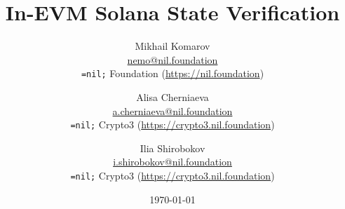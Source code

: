 \setlength{\droptitle}{-4\baselineskip} %

\pretitle{\begin{center}\Huge\bfseries} %
\title{In-EVM Solana State Verification} %
\posttitle{\end{center}} %
\author{ %
    \protect\begin{tabular}{c} \normalsize Mikhail Komarov \\
	    \normalsize \href{mailto:nemo@nil.foundation}{nemo@nil.foundation} \\
	    \normalsize \texttt{=nil;} Foundation (\url{https://nil.foundation})\\ 
	\protect\end{tabular}
    \and
	\protect\begin{tabular}{c} \normalsize Alisa Cherniaeva \\
	    \normalsize \href{mailto:a.cherniaeva@nil.foundation}{a.cherniaeva@nil.foundation} \\
	    \normalsize \texttt{=nil;} Crypto3 (\url{https://crypto3.nil.foundation})\\ 
	\protect\end{tabular}
	\and
	\protect\begin{tabular}{c} \normalsize Ilia Shirobokov \\
	    \normalsize \href{mailto:i.shirobokov@nil.foundation}{i.shirobokov@nil.foundation} \\
	    \normalsize \texttt{=nil;} Crypto3 (\url{https://crypto3.nil.foundation})\\ 
	\protect\end{tabular}
}
\date{\today} %

